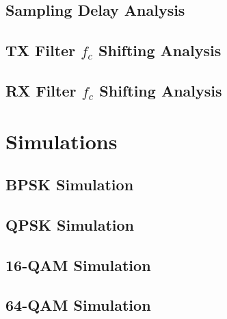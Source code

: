 \documentclass[]{article}
\begin{document}
\subsection{Sampling Delay Analysis}
\label{app:delay}


\subsection{TX Filter $f_c$ Shifting Analysis}
\label{app:freqTX}


\subsection{RX Filter $f_c$ Shifting Analysis}
\label{app:freqRX}


\section{Simulations}
\subsection{BPSK Simulation}


\subsection{QPSK Simulation}


\subsection{16-QAM Simulation}


\subsection{64-QAM Simulation}

\end{document}
